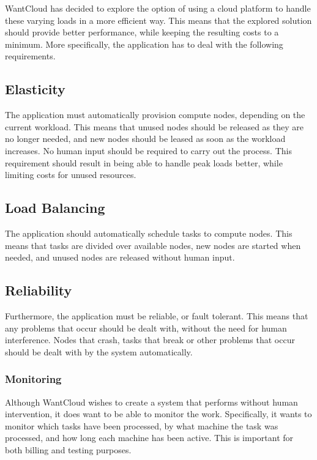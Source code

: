 \documentclass{acm_proc_article-sp}
\begin{document}
WantCloud has decided to explore the option of using a cloud platform to handle these varying loads in a more efficient way.
This means that the explored solution should provide better performance, while keeping the resulting costs to a minimum.
More specifically, the application has to deal with the following requirements.

\subsection{Elasticity}
The application must automatically provision compute nodes, depending on the current workload.
This means that unused nodes should be released as they are no longer needed, and new nodes should be leased as soon as the workload increases.
No human input should be required to carry out the process.
This requirement should result in being able to handle peak loads better, while limiting costs for unused resources.

\subsection{Load Balancing}
The application should automatically schedule tasks to compute nodes.
This means that tasks are divided over available nodes, new nodes are started when needed, and unused nodes are released without human input.

\subsection{Reliability}
Furthermore, the application must be reliable, or fault tolerant.
This means that any problems that occur should be dealt with, without the need for human interference.
Nodes that crash, tasks that break or other problems that occur should be dealt with by the system automatically.

\subsubsection{Monitoring}
Although WantCloud wishes to create a system that performs without human intervention, it does want to be able to monitor the work.
Specifically, it wants to monitor which tasks have been processed, by what machine the task was processed, and how long each machine has been active.
This is important for both billing and testing purposes.

\end{document}
